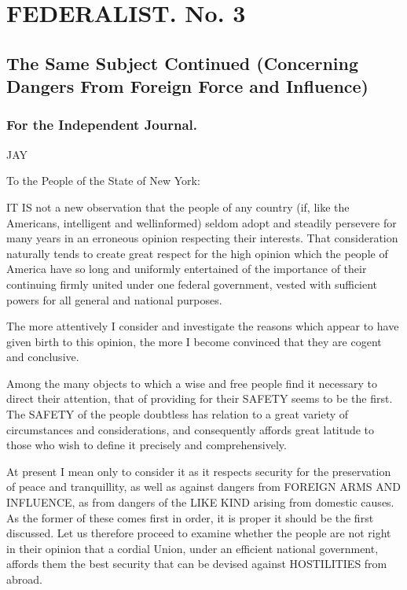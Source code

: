 \chapter*{FEDERALIST. No. 3} %


\section*{The Same Subject Continued (Concerning Dangers From Foreign Force and Influence)}

\subsection*{For the Independent Journal.}

JAY

To the People of the State of New York:

IT IS not a new observation that the people of any country (if,
like the Americans, intelligent and wellinformed) seldom adopt and
steadily persevere for many years in an erroneous opinion respecting
their interests. That consideration naturally tends to create great
respect for the high opinion which the people of America have so
long and uniformly entertained of the importance of their continuing
firmly united under one federal government, vested with sufficient
powers for all general and national purposes.

The more attentively I consider and investigate the reasons
which appear to have given birth to this opinion, the more I become
convinced that they are cogent and conclusive.

Among the many objects to which a wise and free people find it
necessary to direct their attention, that of providing for their
SAFETY seems to be the first. The SAFETY of the people doubtless
has relation to a great variety of circumstances and considerations,
and consequently affords great latitude to those who wish to define
it precisely and comprehensively.

At present I mean only to consider it as it respects security
for the preservation of peace and tranquillity, as well as against
dangers from FOREIGN ARMS AND INFLUENCE, as from dangers of the LIKE
KIND arising from domestic causes. As the former of these comes
first in order, it is proper it should be the first discussed. Let
us therefore proceed to examine whether the people are not right in
their opinion that a cordial Union, under an efficient national
government, affords them the best security that can be devised
against HOSTILITIES from abroad.

